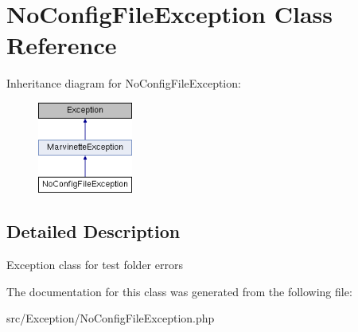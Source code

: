 \hypertarget{classNoConfigFileException}{}\section{No\+Config\+File\+Exception Class Reference}
\label{classNoConfigFileException}
Inheritance diagram for No\+Config\+File\+Exception\+:\begin{figure}[H]
\begin{center}
\leavevmode
\includegraphics[height=3.000000cm]{classNoConfigFileException}
\end{center}
\end{figure}


\subsection{Detailed Description}
Exception class for test folder errors 

The documentation for this class was generated from the following file\+:\begin{DoxyCompactItemize}
\item 
src/\+Exception/No\+Config\+File\+Exception.\+php\end{DoxyCompactItemize}
